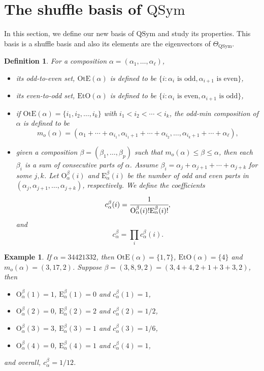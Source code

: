 \documentclass[12pt]{amsart}
\newtheorem{example}[theorem]{Example}
\newtheorem{definition}[theorem]{Definition}
\numberwithin{equation}{section}
\newcommand{\QSym}{\mathrm{QSym}}
\newcommand{\rmO}{\mathrm{O}}
\newcommand{\rmE}{\mathrm{E}}
\newcommand{\OtE}{\mathrm{OtE}}
\newcommand{\EtO}{\mathrm{EtO}}
\begin{document}
\section{The shuffle basis of $\QSym$}\label{sec:basis}
 
In this section, we define our new basis of $\QSym$ and study its properties. This basis is a shuffle basis and also its elements are the eigenvectors of $\Theta_\QSym$. 

\begin{definition}
	For a composition $\alpha=(\alpha_1,\dots,\alpha_\ell)$,
	\begin{itemize}
		\item its odd-to-even set, $\OtE(\alpha)$ is defined to be $\{i:\alpha_i\text{ is odd},\alpha_{i+1}\text{ is even}\}$,
		\item its even-to-odd set, $\EtO(\alpha)$ is defined to be $\{i:\alpha_i\text{ is even},\alpha_{i+1}\text{ is odd}\}$,
		\item if $\OtE(\alpha)=\{i_1,i_2,\dots,i_k\}$ with $i_1<i_2<\cdots<i_k$, the odd-min composition of $\alpha$ is defined to be
		$$m_o(\alpha)=(\alpha_1+\cdots+\alpha_{i_1},\alpha_{i_1+1}+\cdots+\alpha_{i_2},\dots,\alpha_{i_k+1}+\cdots+\alpha_{\ell}),$$
		\item given a composition $\beta=(\beta_1,\dots,\beta_p)$ such that $m_o(\alpha)\leq\beta\leq\alpha$, then each $\beta_i$ is a sum of consecutive parts of $\alpha$. Assume $\beta_i=\alpha_{j}+\alpha_{j+1}+\cdots+\alpha_{j+k}$ for some $j,k$. Let $\rmO_\alpha^\beta(i)$ and $\rmE_\alpha^\beta(i)$ be the number of odd and even parts in $(\alpha_j,\alpha_{j+1},\dots,\alpha_{j+k})$, respectively. We define the coefficients
		$$c_{\alpha}^{\beta}(i)=\cfrac{1}{\rmO_\alpha^\beta(i)!\rmE_\alpha^\beta(i)!},$$
		and
		$$c_\alpha^\beta=\prod_i c_\alpha^\beta(i).$$
	\end{itemize}
\end{definition}

\begin{example}
	If $\alpha=34421332$, then $\OtE(\alpha)=\{1,7\}$, $\EtO(\alpha)=\{4\}$ and $m_o(\alpha)=(3,17,2)$. Suppose $\beta=(3,8,9,2)=(3,4+4,2+1+3+3,2)$, then
	\begin{itemize}
		\item $\rmO_\alpha^\beta(1)=1$, $\rmE_\alpha^\beta(1)=0$ and $c_\alpha^\beta(1)=1$,
		\item $\rmO_\alpha^\beta(2)=0$, $\rmE_\alpha^\beta(2)=2$ and $c_\alpha^\beta(2)=1/2$,
		\item $\rmO_\alpha^\beta(3)=3$, $\rmE_\alpha^\beta(3)=1$ and $c_\alpha^\beta(3)=1/6$,
		\item $\rmO_\alpha^\beta(4)=0$, $\rmE_\alpha^\beta(4)=1$ and $c_\alpha^\beta(4)=1$,
	\end{itemize}
	and overall, $c_\alpha^\beta=1/12$.
\end{example}
\end{document}
